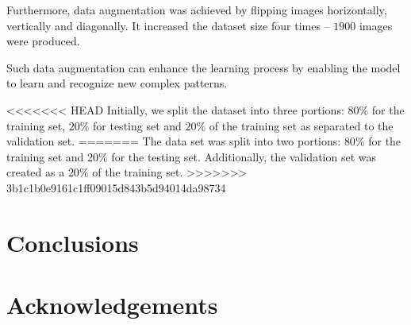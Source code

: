 \documentclass[preprint,9pt]{elsarticle}
\begin{document}
	Furthermore, data augmentation was achieved by flipping images horizontally, vertically and diagonally. 
	It increased the dataset size four times -- \(1900\) images were produced.
	
	Such data augmentation can enhance the learning process by enabling the model to learn and recognize new complex patterns.
	
<<<<<<< HEAD
	Initially, we split the dataset into three portions: \(80\%\) for the training set, \(20\%\) for testing set and \(20\%\) of the training set as separated to the validation set.
=======
	The data set was split into two portions:  \(80\%\) for the training set and \(20\%\) for the testing set.
	Additionally, the validation set was created as a \(20\%\) of the training set.
>>>>>>> 3b1c1b0e9161c1ff09015d843b5d94014da98734
	
	
	
	\section{Conclusions}



	\section*{Acknowledgements}

	
	\section*{ }
	
	
	
	
\end{document}
